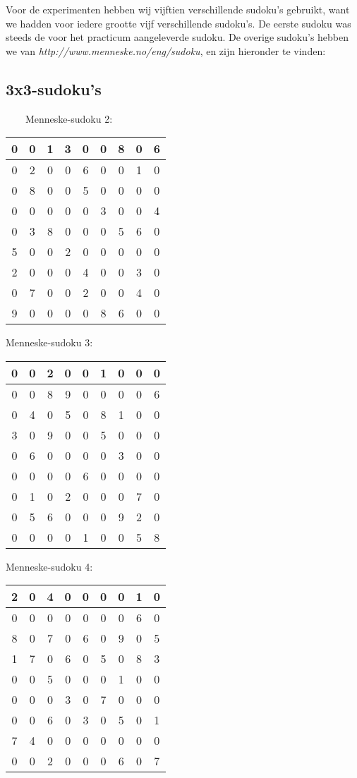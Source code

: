 \documentclass[]{report}
\begin{document}
Voor de experimenten hebben wij vijftien verschillende sudoku's gebruikt, want we hadden voor iedere grootte vijf verschillende sudoku's. De eerste sudoku was steeds de voor het practicum aangeleverde sudoku. De overige sudoku's hebben we van \textit{http://www.menneske.no/eng/sudoku}, en zijn hieronder te vinden: 

\subsection{3x3-sudoku's}
\ \ \ \ Menneske-sudoku 2:
\begin{tabular}{|c|c|c||c|c|c||c|c|c|}
\hline
0 &0& 1& 3& 0& 0& 8& 0& 6 \\ \hline
0 &2 &0 &0 &6 &0 &0& 1& 0\\ \hline
0& 8& 0& 0& 5& 0& 0& 0& 0\\ \hline\hline
0& 0& 0& 0& 0& 3& 0& 0& 4\\ \hline
0 &3 &8 &0 &0 &0 &5 &6 &0\\ \hline
5& 0& 0& 2& 0& 0& 0& 0& 0\\ \hline\hline
2& 0& 0& 0& 4& 0& 0& 3& 0\\ \hline
0 &7 &0 &0 &2 &0 &0 &4 &0\\ \hline
9 &0 &0 &0 &0 &8 &6 &0& 0\\ \hline
\end{tabular}

Menneske-sudoku 3:
\begin{tabular}{|c|c|c||c|c|c||c|c|c|}
\hline
0&0&2&0&0&1&0&0&0 \\ \hline
0&0&8&9&0&0&0&0&6\\ \hline
0&4&0&5&0&8&1&0&0\\ \hline \hline
3&0&9&0&0&5&0&0&0\\ \hline
0&6&0&0&0&0&3&0&0\\ \hline
0&0&0&0&6&0&0&0&0\\ \hline \hline
0&1&0&2&0&0&0&7&0\\ \hline
0&5&6&0&0&0&9&2&0\\ \hline
0&0&0&0&1&0&0&5&8\\ \hline
\end{tabular}

Menneske-sudoku 4:
\begin{tabular}{|c|c|c||c|c|c||c|c|c|}
\hline
2&0&4&0&0&0&0&1&0 \\ \hline
0&0&0&0&0&0&0&6&0\\ \hline
8&0&7&0&6&0&9&0&5\\ \hline \hline
1&7&0&6&0&5&0&8&3\\ \hline
0&0&5&0&0&0&1&0&0\\ \hline
0&0&0&3&0&7&0&0&0\\ \hline \hline
0&0&6&0&3&0&5&0&1\\ \hline
7&4&0&0&0&0&0&0&0\\ \hline
0&0&2&0&0&0&6&0&7\\ \hline
\end{tabular}
\end{document}
